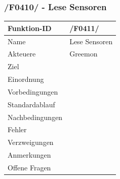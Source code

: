 \documentclass[pointlessnumbers]{scrartcl}
\begin{document}
%

 \subsubsection{/F0410/ - Lese Sensoren}
 \begin{tabular}{|p{\BreiteErsterTab}|p{\BreiteZweiterTab}|}\hline
    Funktion-ID &       /F0411/  
                        \\ \hline
    Name &              Lese Sensoren
                        \\ \hline
    Akteuere &          Greemon
                        \\ \hline
    Ziel &              
                        \\ \hline
    Einordnung &        
                        \\ \hline
    Vorbedingungen &    
                        \\ \hline
    Standardablauf &    
                        \\ \hline
    Nachbedingungen &   
                        \\ \hline
    Fehler &       
                        \\ \hline
    Verzweigungen &     
                        \\ \hline
    Anmerkungen &       
                        \\ \hline
    Offene Fragen &     
                        \\ \hline
 \end{tabular} 
\end{document}
